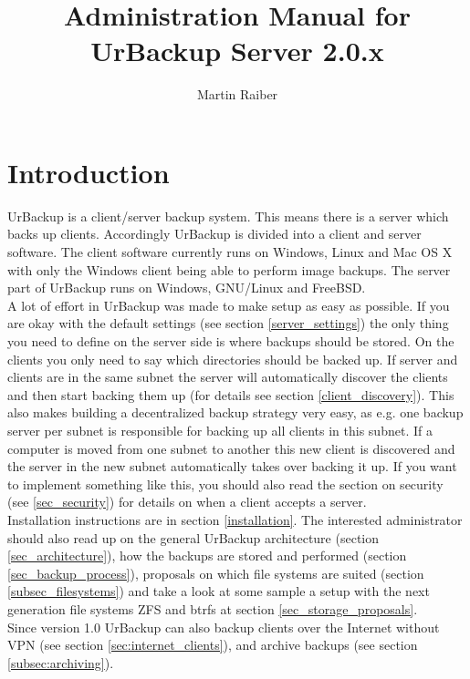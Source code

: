 \documentclass[a4paper,10pt]{article}
\begin{document}

\author{Martin Raiber}
\title{Administration Manual for\\UrBackup Server 2.0.x}

\maketitle

\tableofcontents

\newpage

\section{Introduction}

UrBackup is a client/server backup system. This means there is a server
which backs up clients. Accordingly UrBackup is divided into a client and server
software.
The client software currently runs on Windows, Linux and Mac OS X with only
the Windows client being able to perform image backups. 
The server part of UrBackup runs on Windows, GNU/Linux and FreeBSD.\\
A lot of effort in UrBackup was made to make setup as easy as possible. If you
are okay with the default settings (see section \ref{server_settings}) the only
thing you need to define on the server side is where backups should be stored.
On the clients you only need to say which directories should be backed up. If
server and clients are in the same subnet the server will automatically discover
the clients and then start backing them up (for details see section
\ref{client_discovery}). This also makes building a decentralized backup
strategy very easy, as e.g. one backup server per subnet is responsible for
backing up all clients in this subnet. If a computer is moved from one subnet to
another this new client is discovered and the server in the new subnet
automatically takes over backing it up. If you want to implement something like
this, you should also read the section on security (see \ref{sec_security}) for
details on when a client accepts a server.\\
Installation instructions are in section \ref{installation}.
The interested administrator should also read up on the general UrBackup architecture
(section \ref{sec_architecture}), how the backups are stored and performed
(section \ref{sec_backup_process}), proposals on which file systems are suited
(section \ref{subsec_filesystems}) and take a look at some sample a setup with
the next generation file systems ZFS and btrfs at section \ref{sec_storage_proposals}.\\
Since version 1.0 UrBackup can also backup clients over the Internet without VPN (see section
\ref{sec:internet_clients}), and archive backups (see section \ref{subsec:archiving}).
\end{document}
